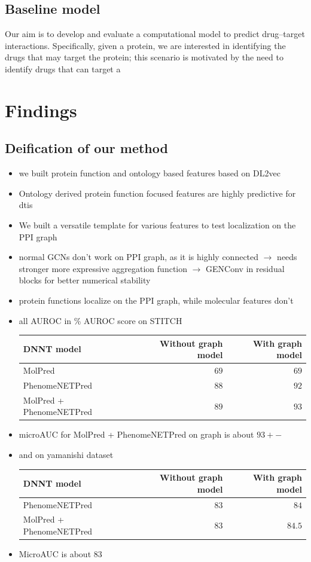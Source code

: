 \documentclass{bioinfo}
\begin{document}
\subsection{Baseline model}
Our aim is to develop and evaluate a computational model to predict
drug--target interactions. Specifically, given a protein, we are
interested in identifying the drugs that may target the protein; this
scenario is motivated by the need to identify drugs that can target a

\section{Findings}

\subsection{Deification of our method}
\begin{itemize}
	\item we built protein function and ontology based features based on DL2vec
	\item Ontology derived protein function focused features are highly predictive for dtis
	\item We built a versatile template for various features to test localization on the PPI graph
	\item normal GCNs don't work on PPI graph, as it is highly connected $\rightarrow$ needs stronger more expressive aggregation function $\rightarrow$ GENConv in residual blocks for better numerical stability
	\item protein functions localize on the PPI graph, while molecular features don't
	\item all AUROC in \% AUROC score on STITCH
	
	\begin{tabular}{|l|r|r|}
		\hline
		DNNT model&Without graph model&With graph model\\
		\hline
		MolPred&$69$&$69$\\
		PhenomeNETPred&$88$&$92$\\
		\hline
		MolPred + PhenomeNETPred & $89$ & $93$\\
		\hline
	\end{tabular}
	\item microAUC for MolPred + PhenomeNETPred on graph is about $93+-$
	\item and on yamanishi dataset
	
	\begin{tabular}{|l|r|r|}
		\hline
		DNNT model&Without graph model&With graph model\\
		\hline
		PhenomeNETPred&$83$&$84$\\
		\hline
		MolPred + PhenomeNETPred & $83$ & $84.5$\\
		\hline
	\end{tabular}
	\item MicroAUC is about $83$
\end{itemize}
\end{document}
